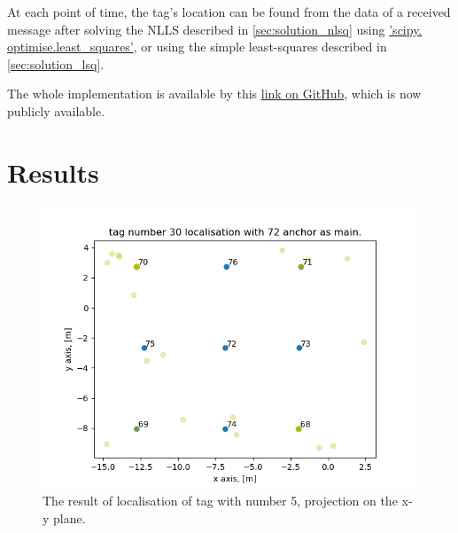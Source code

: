 \documentclass[journal]{IEEEtran}
\begin{document}
At each point of time, the tag's location can be found from the data of a received message after solving the NLLS described in \autoref{sec:solution_nlsq} using \href{https://docs.scipy.org/doc/scipy/reference/generated/scipy.optimize.least_squares.html#scipy.optimize.least_squares}{'scipy. optimise.least\_squares'}, or using the simple least-squares described in \autoref{sec:solution_lsq}.

The whole implementation is available by this \href{https://github.com/Myralllka/CTU_diagnostics_and_testing/tree/master/semestral_project_tdoa_trajectory_reconstruction}{link on GitHub}, which is now publicly available.
\section{Results}
\label{sec:res}
\begin{figure}[ht]%
    \centering
    \includegraphics[width=\linewidth]{graphics/ress/tdoa_tag5_est.png}
    \caption{The result of localisation of tag with number 5, projection on the x-y plane.}
    \label{fig:tdoa_tag5_res}
\end{figure}
\end{document}
